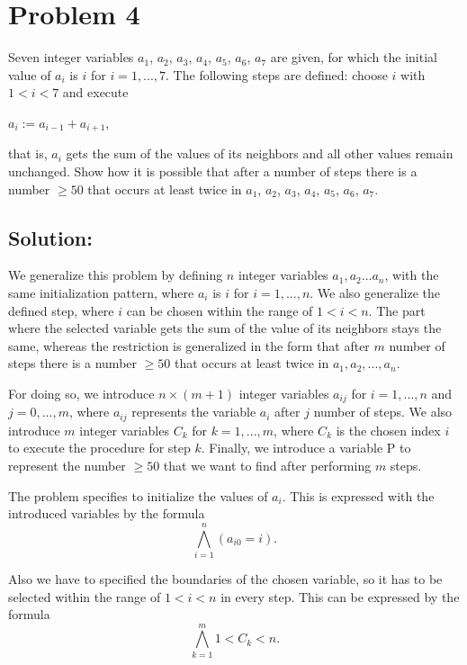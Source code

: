 \section*{Problem 4}

Seven integer variables $a_{1}$, $a_{2}$, $a_{3}$, $a_{4}$, $a_{5}$, $a_{6}$, $a_{7}$ are given, for which the initial value of $a_{i}$ is $i$ for $i = 1, . . . , 7$. The following steps are defined: choose $i$ with $1 < i < 7$ and execute
\begin{center}
$a_{i} := a_{i - 1} + a_{i+1}$,\\
\end{center}
that is, $a_{i}$ gets the sum of the values of its neighbors and all other values remain unchanged. Show how it is possible that after a number of steps there is a number $\geq 50$ that occurs at least twice in $a_{1}$, $a_{2}$, $a_{3}$, $a_{4}$, $a_{5}$, $a_{6}$, $a_{7}$.
\vspace{4mm}

\subsection*{Solution:}

We generalize this problem by defining $n$ integer variables $a_{1}, a_{2} . . . a_{n}$, with the same initialization pattern, where $a_{i}$ is $i$ for $i = 1, . . . , n$. We also generalize the defined step, where $i$ can be chosen within the range of $1 < i < n$. The part where the selected variable gets the sum of the value of its neighbors stays the same, whereas the restriction is generalized in the form that after $m$ number of steps there is a number $\geq 50$ that occurs at least twice in $a_{1}, a_{2}, . . . , a_{n}$.

For doing so, we introduce $n\times (m+1)$ integer variables $a_{ij}$ for $i = 1, . . . , n$ and $j = 0, . . . , m$, where $a_{ij}$ represents the variable $a_{i}$ after $j$ number of steps. We also introduce $m$ integer variables $C_k$ for $k = 1, . . . , m$, where $C_k$ is the chosen index $i$ to execute the procedure for step $k$. Finally, we introduce a variable P to represent the number $\geq 50$ that we want to find after performing $m$ steps.

The problem specifies to initialize the values of $a_i$. This is expressed with the introduced variables by the formula
\[ \bigwedge_{i=1}^n (a_{i0} = i).\]

Also we have to specified the boundaries of the chosen variable, so it has to be selected within the range of $1 < i < n$ in every step. This can be expressed by the formula
\[ \bigwedge_{k=1}^m 1<C_k<n.\]

